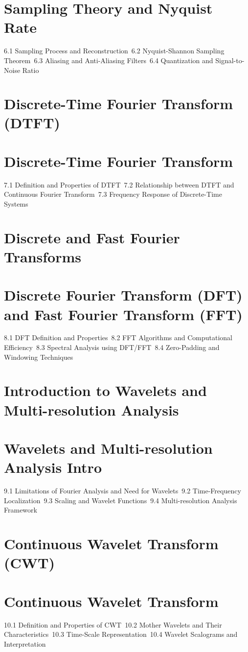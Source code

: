 \section{Sampling Theory and Nyquist Rate}
6.1 Sampling Process and Reconstruction\
6.2 Nyquist-Shannon Sampling Theorem\
6.3 Aliasing and Anti-Aliasing Filters\
6.4 Quantization and Signal-to-Noise Ratio\
\section{Discrete-Time Fourier Transform (DTFT)}
\section{Discrete-Time Fourier Transform}
7.1 Definition and Properties of DTFT\
7.2 Relationship between DTFT and Continuous Fourier Transform\
7.3 Frequency Response of Discrete-Time Systems\
\section{Discrete and Fast Fourier Transforms}
\section{Discrete Fourier Transform (DFT) and Fast Fourier Transform (FFT)}
8.1 DFT Definition and Properties\
8.2 FFT Algorithms and Computational Efficiency\
8.3 Spectral Analysis using DFT/FFT\
8.4 Zero-Padding and Windowing Techniques\
\section{Introduction to Wavelets and Multi-resolution Analysis}
\section{Wavelets and Multi-resolution Analysis Intro}
9.1 Limitations of Fourier Analysis and Need for Wavelets\
9.2 Time-Frequency Localization\
9.3 Scaling and Wavelet Functions\
9.4 Multi-resolution Analysis Framework\
\section{Continuous Wavelet Transform (CWT)}
\section{Continuous Wavelet Transform}
10.1 Definition and Properties of CWT\
10.2 Mother Wavelets and Their Characteristics\
10.3 Time-Scale Representation\
10.4 Wavelet Scalograms and Interpretation\
